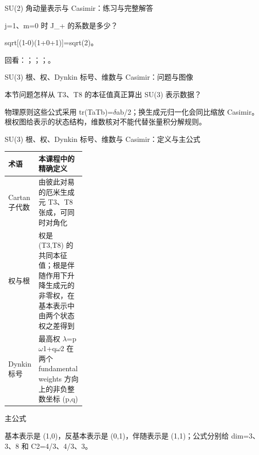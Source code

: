 \begin{frame}[t]{SU(2) 角动量表示与 Casimir：练习与完整解答}
\footnotesize
\begin{block}{}j=1、m=0 时 J\_+ 的系数是多少？\end{block}
\begin{exampleblock}{}sqrt[(1-0)(1+0+1)]=sqrt(2)。\end{exampleblock}
\vfill
\scriptsize 回看：；；；。
\end{frame}

\begin{frame}[t]{SU(3) 根、权、Dynkin 标号、维数与 Casimir：问题与图像}
\footnotesize
\begin{block}{本节问题}怎样从 T3、T8 的本征值真正算出 SU(3) 表示数据？\end{block}
\begin{block}{物理原则}\quad 这些公式采用 tr(TaTb)=\ensuremath{\delta}ab/\allowbreak{}2；换生成元归一化会同比缩放 Casimir。根权图给表示的状态结构，维数核对不能代替张量积分解规则。\end{block}
\end{frame}

\begin{frame}[t]{SU(3) 根、权、Dynkin 标号、维数与 Casimir：定义与主公式}
\footnotesize\begin{tabularx}{\linewidth}{p{0.30\linewidth}Y}
\toprule 术语 & 本课程中的精确定义\\\midrule
{} Cartan 子代数 & 由彼此对易的厄米生成元 T3、T8 张成，可同时对角化\\
 权与根 & 权是 (T3,T8) 的共同本征值；根是伴随作用下升降生成元的非零权，在基本表示中由两个状态权之差得到\\
 Dynkin 标号 & 最高权 \ensuremath{\lambda}=p\ensuremath{\omega}1+q\ensuremath{\omega}2 在两个 fundamental weights 方向上的非负整数坐标 (p,q)\\
\bottomrule\end{tabularx}\vspace{0.15cm}
\begin{block}{ 主公式}\centering{}\end{block}
基本表示是 (1,0)，反基本表示是 (0,1)，伴随表示是 (1,1)；公式分别给 dim=3、3、8 和 C2=4/\allowbreak{}3、4/\allowbreak{}3、3。
\end{frame}

